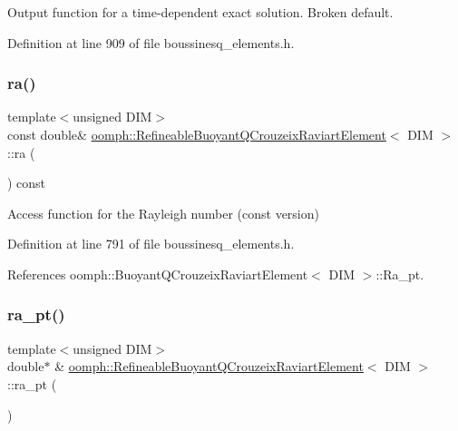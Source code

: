 Output function for a time-\/dependent exact solution. Broken default. 



Definition at line 909 of file boussinesq\+\_\+elements.\+h.

\mbox{\label{classoomph_1_1RefineableBuoyantQCrouzeixRaviartElement_a56e468f0ee6553a538f6f8d460e6364e}} 
\subsubsection{\texorpdfstring{ra()}{ra()}}
{\footnotesize\ttfamily template$<$unsigned D\+IM$>$ \\
const double\& \hyperlink{classoomph_1_1RefineableBuoyantQCrouzeixRaviartElement}{oomph\+::\+Refineable\+Buoyant\+Q\+Crouzeix\+Raviart\+Element}$<$ D\+IM $>$\+::ra (\begin{DoxyParamCaption}{ }\end{DoxyParamCaption}) const\hspace{0.3cm}{\ttfamily [inline]}}



Access function for the Rayleigh number (const version) 



Definition at line 791 of file boussinesq\+\_\+elements.\+h.



References oomph\+::\+Buoyant\+Q\+Crouzeix\+Raviart\+Element$<$ D\+I\+M $>$\+::\+Ra\+\_\+pt.

\mbox{\label{classoomph_1_1RefineableBuoyantQCrouzeixRaviartElement_acd96d12e3caedc1a38582079d977c0e4}} 
\subsubsection{\texorpdfstring{ra\+\_\+pt()}{ra\_pt()}}
{\footnotesize\ttfamily template$<$unsigned D\+IM$>$ \\
double$\ast$ \& \hyperlink{classoomph_1_1RefineableBuoyantQCrouzeixRaviartElement}{oomph\+::\+Refineable\+Buoyant\+Q\+Crouzeix\+Raviart\+Element}$<$ D\+IM $>$\+::ra\+\_\+pt (\begin{DoxyParamCaption}{ }\end{DoxyParamCaption})\hspace{0.3cm}{\ttfamily [inline]}}



